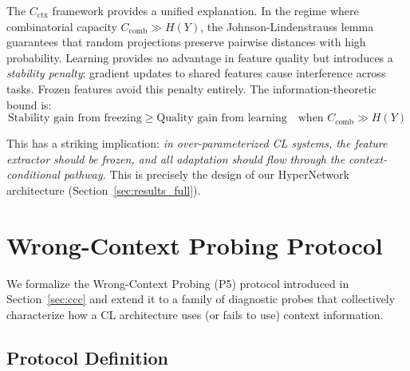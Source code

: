 \documentclass{article}
\begin{document}
The $C_\mathrm{ctx}$ framework provides a unified explanation. In the regime where combinatorial capacity $C_\mathrm{comb} \gg H(Y)$, the Johnson-Lindenstrauss lemma guarantees that random projections preserve pairwise distances with high probability. Learning provides no advantage in feature quality but introduces a \emph{stability penalty}: gradient updates to shared features cause interference across tasks. Frozen features avoid this penalty entirely. The information-theoretic bound is:
\begin{equation}
    \text{Stability gain from freezing} \geq \text{Quality gain from learning} \quad \text{when } C_\mathrm{comb} \gg H(Y)
\end{equation}

This has a striking implication: \emph{in over-parameterized CL systems, the feature extractor should be frozen, and all adaptation should flow through the context-conditional pathway.} This is precisely the design of our HyperNetwork architecture (Section~\ref{sec:results_full}).

\section{Wrong-Context Probing Protocol}
\label{sec:p5_protocol}

We formalize the Wrong-Context Probing (P5) protocol introduced in Section~\ref{sec:ccc} and extend it to a family of diagnostic probes that collectively characterize how a CL architecture uses (or fails to use) context information.

\subsection{Protocol Definition}
\end{document}
